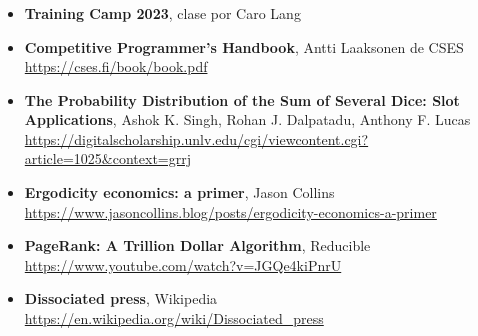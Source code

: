 \documentclass[../main.tex]{subfiles}
\begin{document}
\begin{frame}
  \frametitle{\SECTIONEB}
  
  \begin{itemize}
  \item \textbf{Training Camp 2023}, clase por Caro Lang \\
  \item \textbf{Competitive Programmer's Handbook}, Antti Laaksonen de CSES \\
      \href{https://cses.fi/book/book.pdf}{https://cses.fi/book/book.pdf}
  \item \textbf{The Probability Distribution of the Sum of Several Dice: Slot Applications}, Ashok K. Singh, Rohan J. Dalpatadu, Anthony F. Lucas \\
      \href{https://digitalscholarship.unlv.edu/cgi/viewcontent.cgi?article=1025&context=grrj}{https://digitalscholarship.unlv.edu/cgi/viewcontent.cgi?article=1025\&context=grrj}
  \item \textbf{Ergodicity economics: a primer}, Jason Collins \\
    \href{https://www.jasoncollins.blog/posts/ergodicity-economics-a-primer}{https://www.jasoncollins.blog/posts/ergodicity-economics-a-primer}
  \item \textbf{PageRank: A Trillion Dollar Algorithm}, Reducible \\
    \href{https://www.youtube.com/watch?v=JGQe4kiPnrU}{https://www.youtube.com/watch?v=JGQe4kiPnrU}
  \item \textbf{Dissociated press}, Wikipedia \\
    \href{https://en.wikipedia.org/wiki/Dissociated_press}{https://en.wikipedia.org/wiki/Dissociated\_press}
  \end{itemize}
\end{frame}
\end{document}
